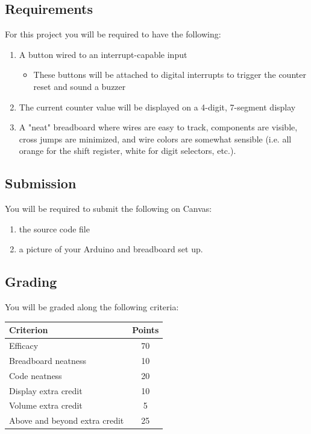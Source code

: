     \subsection*{Requirements}
    For this project you will be required to have the following:
    \begin{enumerate}
        \item A button wired to an interrupt-capable input
            \begin{itemize}
                \item These buttons will be attached to digital interrupts to trigger the counter reset and sound a buzzer
            \end{itemize}
        \item The current counter value will be displayed on a 4-digit, 7-segment display
        \item A "neat" breadboard where wires are easy to track, components are visible, cross jumps are minimized, and wire colors are somewhat sensible (i.e. all orange for the shift register, white for digit selectors, etc.).
    \end{enumerate}

    \subsection*{Submission}
    You will be required to submit the following on Canvas:
    \begin{enumerate}
        \item the source code file
        \item a picture of your Arduino and breadboard set up.
    \end{enumerate}

    \subsection*{Grading}
    You will be graded along the following criteria:

    \begin{margintable}[-0.5in]
        \begin{tabular}{ l | c }
            \toprule
            Criterion & Points \\

            \midrule
            Efficacy & 70 \\
            Breadboard neatness & 10 \\
            Code neatness & 20 \\
            Display extra credit & 10 \\
            Volume extra credit & 5 \\
            Above and beyond extra credit & 25 \\

            \bottomrule
        \end{tabular}
    \end{margintable}

